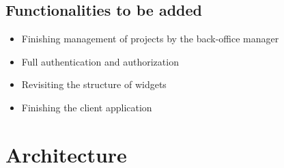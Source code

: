 \documentclass[a4paper,twoside,10pt]{report}
\begin{document}
\subsection{Functionalities to be added}
\begin{itemize}
    \item Finishing management of projects by the back-office manager
    \item Full authentication and authorization
    \item Revisiting the structure of widgets
    \item Finishing the client application
\end{itemize}

\section{Architecture}
\end{document}
